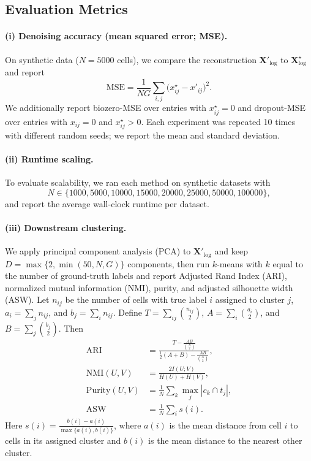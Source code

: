 \documentclass[sigconf,review]{acmart}
\theoremstyle{plain}
\theoremstyle{definition}
\theoremstyle{remark}
\begin{document}
\subsection{Evaluation Metrics}
\label{sec:evaluation}
\paragraph{(i) Denoising accuracy (mean squared error; MSE).}
On synthetic data ($N=5000$ cells), we compare the reconstruction
$\mathbf{X}'_{\log}$ to $\mathbf{X}^{\star}_{\log}$ and report
\[
\mathrm{MSE}=\frac{1}{NG}\sum_{i,j}\big(x^{\star}_{ij}-x'_{ij}\big)^2.
\]
We additionally report biozero-MSE over entries with $x^\star_{ij}=0$ and
dropout-MSE over entries with $x_{ij}=0$ and $x^\star_{ij}>0$. Each experiment
was repeated 10 times with different random seeds; we report the mean and
standard deviation.

\paragraph{(ii) Runtime scaling.}
To evaluate scalability, we ran each method on synthetic datasets with
\[
N\in\{1000, 5000, 10000, 15000, 20000, 25000, 50000, 100000\},
\]
and report the average wall-clock runtime per dataset.

\paragraph{(iii) Downstream clustering.}
We apply principal component analysis (PCA) to $\mathbf{X}'_{\log}$ and keep
$D=\max\{2,\min(50,N,G)\}$ components, then run $k$-means with $k$ equal to
the number of ground-truth labels and report Adjusted Rand Index (ARI),
normalized mutual information (NMI), purity, and adjusted silhouette width (ASW). Let
$n_{ij}$ be the number of cells with true label $i$ assigned to cluster $j$,
$a_i=\sum_j n_{ij}$, and $b_j=\sum_i n_{ij}$. Define
$T=\sum_{ij}\binom{n_{ij}}{2}$, $A=\sum_i\binom{a_i}{2}$, and
$B=\sum_j\binom{b_j}{2}$. Then
\[
\begin{aligned}
\text{ARI} &= \frac{T-\frac{AB}{\binom{N}{2}}}{\frac{1}{2}(A+B)-\frac{AB}{\binom{N}{2}}},\\
\text{NMI}(U,V) &= \frac{2I(U;V)}{H(U)+H(V)},\\
\text{Purity}(U,V) &= \frac{1}{N}\sum_k \max_j |c_k\cap t_j|,\\
\text{ASW} &= \frac{1}{N}\sum_i s(i).
\end{aligned}
\]
Here $s(i)=\frac{b(i)-a(i)}{\max\{a(i),b(i)\}}$, where $a(i)$ is the mean
distance from cell $i$ to cells in its assigned cluster and $b(i)$ is the mean
distance to the nearest other cluster.
\end{document}
